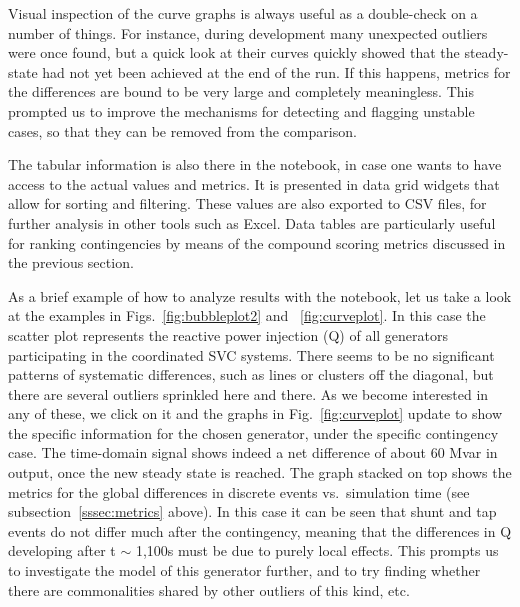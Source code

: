 \documentclass[conference]{IEEEtran}
\begin{document}
Visual inspection of the curve graphs is always useful as a double-check on a
number of things. For instance, during development many unexpected
outliers were once found, but a quick look at their curves quickly showed that the steady-state
had not yet been achieved at the end of the run. If this happens, metrics for
the differences are bound to be very large and completely meaningless.  This
prompted us to improve the mechanisms for detecting and flagging unstable cases,
so that they can be removed from the comparison.

The tabular information is also there in the notebook, in case one wants to have
access to the actual values and metrics. It is presented in data grid widgets
that allow for sorting and filtering.  These values are also exported to CSV
files, for further analysis in other tools such as Excel.  Data tables are
particularly useful for ranking contingencies by means of the compound scoring
metrics discussed in the previous section.

As a brief example of how to analyze results with the notebook, let us take a
look at the examples in Figs.~\ref{fig:bubbleplot2} and ~\ref{fig:curveplot}. In
this case the scatter plot represents the reactive power injection (Q) of all
generators participating in the coordinated SVC
systems. There seems to be no significant patterns of systematic differences,
such as lines or clusters off the diagonal, but there are several outliers
sprinkled here and there.  As we become interested in any of these, we click on
it and the graphs in Fig.~\ref{fig:curveplot} update to show the specific
information for the chosen generator, under the specific contingency case. The
time-domain signal shows indeed a net difference of about 60 Mvar in output,
once the new steady state is reached. The graph stacked on top shows the metrics
for the global differences in discrete events vs.~simulation time (see
subsection~\ref{sssec:metrics} above).  In this case it can be seen that shunt and
tap events do not differ much after the contingency, meaning that the
differences in Q developing after t $\sim$ 1,100s must be due to purely local
effects. This prompts us to investigate the model of this generator further, and
to try finding whether there are commonalities shared by other outliers of this
kind, etc.
\end{document}
